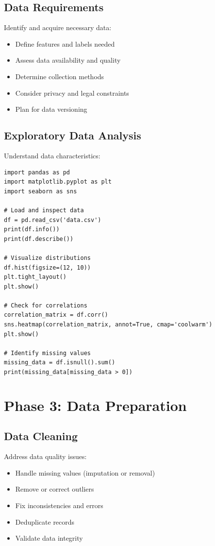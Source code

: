 \subsection{Data Requirements}

Identify and acquire necessary data:

\begin{itemize}
    \item Define features and labels needed
    \item Assess data availability and quality
    \item Determine collection methods
    \item Consider privacy and legal constraints
    \item Plan for data versioning
\end{itemize}

\subsection{Exploratory Data Analysis}

Understand data characteristics:

\begin{lstlisting}[style=python]
import pandas as pd
import matplotlib.pyplot as plt
import seaborn as sns

# Load and inspect data
df = pd.read_csv('data.csv')
print(df.info())
print(df.describe())

# Visualize distributions
df.hist(figsize=(12, 10))
plt.tight_layout()
plt.show()

# Check for correlations
correlation_matrix = df.corr()
sns.heatmap(correlation_matrix, annot=True, cmap='coolwarm')
plt.show()

# Identify missing values
missing_data = df.isnull().sum()
print(missing_data[missing_data > 0])
\end{lstlisting}

\section{Phase 3: Data Preparation}

\subsection{Data Cleaning}

Address data quality issues:

\begin{itemize}
    \item Handle missing values (imputation or removal)
    \item Remove or correct outliers
    \item Fix inconsistencies and errors
    \item Deduplicate records
    \item Validate data integrity
\end{itemize}

